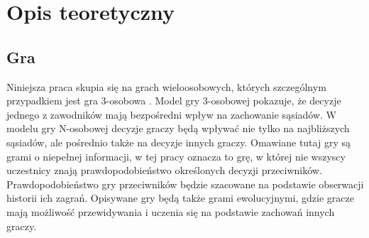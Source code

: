 \chapter{Opis teoretyczny}
\label{cha:opis_teor}

\section{Gra}
\label{sec:gra}
Niniejsza praca skupia się na grach wieloosobowych, których szczególnym przypadkiem jest gra 3-osobowa \cite{Str01}. Model gry 3-osobowej pokazuje, że decyzje jednego z zawodników mają bezpośredni wpływ na zachowanie sąsiadów. W modelu gry N-osobowej decyzje graczy będą wpływać nie tylko na najbliższych sąsiadów, ale pośrednio także na decyzje innych graczy.
Omawiane tutaj gry są grami o niepełnej informacji, w tej pracy oznacza to grę, w której nie wszyscy uczestnicy znają prawdopodobieństwo określonych decyzji przeciwników. Prawdopodobieństwo gry przeciwników będzie szacowane na podstawie obserwacji historii ich zagrań.
Opisywane gry będą także grami ewolucyjnymi, gdzie gracze mają możliwość przewidywania i uczenia się na podstawie zachowań innych graczy.

